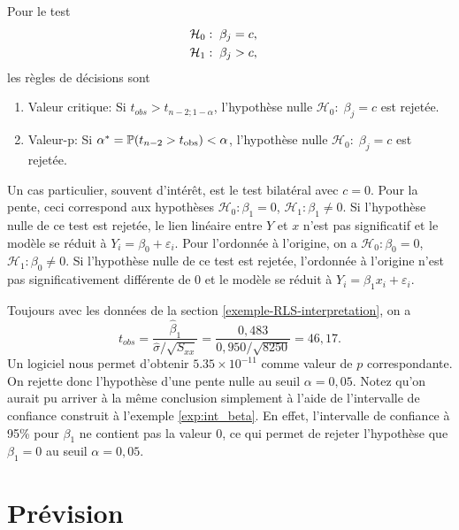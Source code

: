 Pour le test
\begin{align*}
    \mathcal{H}_0&: \; \beta_j = c, \cr
    \mathcal{H}_1&: \; \beta_j > c,
\end{align*}
les règles de décisions sont
\begin{enumerate}[label=(\roman*)]
    \item Valeur critique: Si $t_{obs} > t_{n-2; 1-\alpha}$, l'hypothèse nulle $\mathcal{H}_0: \; \beta_j = c$ est rejetée.
    \item Valeur-p: Si $\alpha^* = \mathbb{P}(t_{n-2}>t_{\text{obs}}) < \alpha$,  l'hypothèse nulle $\mathcal{H}_0: \; \beta_j = c$ est rejetée.
\end{enumerate}

Un cas particulier, souvent d'intérêt, est le test bilatéral avec $c=0$. Pour la pente, ceci correspond aux hypothèses
$\mathcal{H}_0: \beta_1 = 0$, $\mathcal{H}_1: \beta_1 \neq 0$. Si l'hypothèse nulle de ce test est rejetée, le lien linéaire entre $Y$ et $x$ n'est pas significatif et le modèle se réduit à $Y_i = \beta_0 + \varepsilon_i$. Pour l'ordonnée à l'origine, on a $\mathcal{H}_0: \beta_0 = 0$, $\mathcal{H}_1: \beta_0 \neq 0$. Si l'hypothèse nulle de ce test est rejetée, l'ordonnée à l'origine n'est pas significativement différente de 0 et le modèle se réduit à $Y_i = \beta_1 x_i + \varepsilon_i$.


\begin{exemple}
Toujours avec les données de la section \ref{exemple-RLS-interpretation}, on a
$$ t_{obs} = \frac{\widehat{\beta}_1}{\widehat\sigma/\sqrt{S_{xx}}} = \frac{0,483}{0,950/\sqrt{8250}} = 46,17. $$
Un logiciel nous permet d'obtenir $5.35 \times 10^{-11}$ comme valeur de $p$ correspondante. On rejette donc l'hypothèse d'une pente nulle au seuil $\alpha = 0,05$. Notez qu'on aurait pu arriver à la même conclusion simplement à l'aide de l'intervalle de confiance construit à l'exemple \ref{exp:int_beta}. En effet, l'intervalle de confiance à 95\% pour $\beta_1$ ne contient pas la valeur $0$, ce qui permet de rejeter l'hypothèse que $\beta_1 = 0$ au seuil $\alpha = 0,05$.
\end{exemple}


\section{Prévision}
\label{sec:PrévisionRLS}

